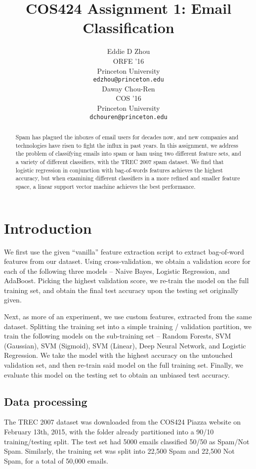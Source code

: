 \documentclass{article} %
\title{COS424 Assignment 1: Email Classification}
\author{
Eddie D Zhou\\
ORFE '16\\
Princeton University\\
\texttt{edzhou@princeton.edu} \\
\And
Daway Chou-Ren\\
COS '16\\
Princeton University\\
\texttt{dchouren@princeton.edu} \\
}
\begin{document}
\maketitle

\begin{abstract}
Spam has plagued the inboxes of email users for decades now, and new companies and technologies have risen to fight the influx in past years.  In this assignment, we address the problem of classifying emails into spam or ham using two different feature sets, and a variety of different classifiers, with the TREC 2007 spam dataset.  We find that logistic regression in conjunction with bag-of-words features achieves the highest accuracy, but when examining different classifiers in a more refined and smaller feature space, a linear support vector machine achieves the best performance.
\end{abstract}
\section{Introduction}
We first use the given ``vanilla'' feature extraction script to extract bag-of-word features from our dataset.  Using cross-validation, we obtain a validation score for each of the following three models -- Naive Bayes, Logistic Regression, and AdaBoost.  Picking the highest validation score, we re-train the model on the full training set, and obtain the final test accuracy upon the testing set originally given.\par 
Next, as more of an experiment, we use custom features, extracted from the same dataset.  Splitting the training set into a simple training / validation partition, we train the following models on the sub-training set -- Random Forests, SVM (Gaussian), SVM (Sigmoid), SVM (Linear), Deep Neural Network, and Logistic Regression.  We take the model with the highest accuracy on the untouched validation set, and then re-train said model on the full training set.  Finally, we evaluate this model on the testing set to obtain an unbiased test accuracy.
\subsection{Data processing}
The TREC 2007 dataset was downloaded from the COS424 Piazza website on February 13th, 2015, with the folder already partitioned into a 90/10 training/testing split. The test set had 5000 emails classified 50/50 as Spam/Not Spam. Similarly, the training set was split into 22,500 Spam and 22,500 Not Spam, for a total of 50,000 emails. 
\end{document}
